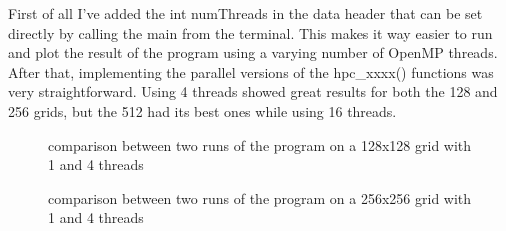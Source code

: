 \documentclass[unicode,11pt,a4paper,oneside,numbers=endperiod,openany]{scrartcl}
\begin{document}
First of all I've added the int numThreads in the data header that can be set directly by calling the main from the terminal. This makes it way easier to run and plot the result of the program using a varying number of OpenMP threads.
\newline
After that, implementing the parallel versions of the hpc\_xxxx() functions was very straightforward. 
\newline
Using 4 threads showed great results for both the 128 and 256 grids, but the 512 had its best ones while using 16 threads.
\newline
\begin{figure}[H]
\centering
  \hfill
  \caption{comparison between two runs of the program on a 128x128 grid with 1 and 4 threads}
\end{figure}
\begin{figure}[H]
\centering
  \hfill
  \caption{comparison between two runs of the program on a 256x256 grid with 1 and 4 threads}
\end{figure}
\end{document}
